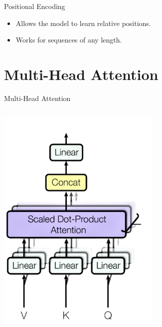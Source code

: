 \documentclass[serif, aspectratio=169]{beamer}
\begin{document}
\begin{frame}{Positional Encoding}
	\begin{itemize}
		\item Allows the model to learn relative positions.
		\item Works for sequences of any length.
	\end{itemize}
\end{frame}

\section{Multi-Head Attention}

\begin{frame}{Multi-Head Attention}
	
	
	
	    \begin{columns}[c]
		\centering
		\includegraphics[width=0.7\textwidth]{pic/multihead-attention-2.png}
		

\end{columns}
\end{frame}
\end{document}
